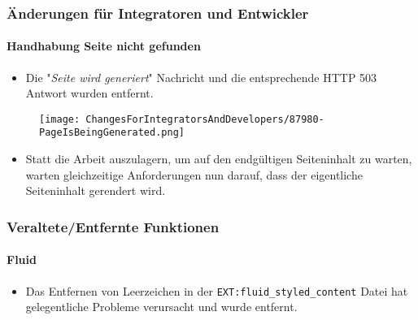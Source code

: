 
\begin{frame}[fragile]
	\frametitle{Änderungen für Integratoren und Entwickler}
	\framesubtitle{Handhabung Seite nicht gefunden}

	\begin{itemize}

		\item Die "\textit{Seite wird generiert}" Nachricht und die entsprechende 
			HTTP 503 Antwort wurden entfernt.
	\end{itemize}

	\begin{figure}
		\texttt{[image: ChangesForIntegratorsAndDevelopers/87980-PageIsBeingGenerated.png]}
	\end{figure}

	\begin{itemize}
		\item Statt die Arbeit auszulagern, um auf den endgültigen Seiteninhalt zu warten, warten gleichzeitige
			Anforderungen nun darauf, dass der eigentliche Seiteninhalt gerendert wird.
	\end{itemize}

\end{frame}


\begin{frame}[fragile]
	\frametitle{Veraltete/Entfernte Funktionen}
	\framesubtitle{Fluid}

	\begin{itemize}
		\item Das Entfernen von Leerzeichen in der \texttt{EXT:fluid\_styled\_content} Datei hat 
			gelegentliche Probleme verursacht und wurde entfernt.

	\end{itemize}

\end{frame}



